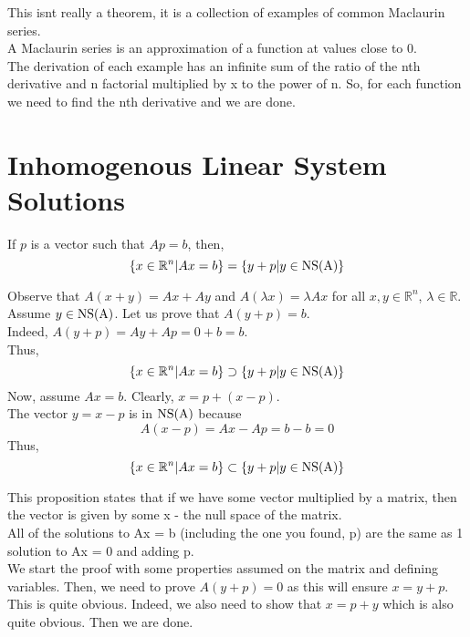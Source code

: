 \documentclass[12pt]{article}
\begin{document}
\begin{explanation}{}
    This isnt really a theorem, it is a collection of examples of common Maclaurin series.\\
A Maclaurin series is an approximation of a function at values close to 0.\\
The derivation of each example has an infinite sum of the ratio of the nth derivative and n factorial multiplied by x to the power of n. So, for each function we need to find the nth derivative and we are done.\\
\end{explanation}


\section{Inhomogenous Linear System Solutions}
\begin{proposition}{}
If \(p\) is a vector such that \(Ap = b\), then,
\[\{x\in \mathbb R^n | Ax = b\} = \{y + p | y\in \rm{NS}(A)\}\]
\end{proposition}
\begin{prf}{}
Observe that \(A(x+y) = Ax + Ay\) and \(A(\lambda x) = \lambda Ax\) for all \(x, y \in \mathbb R^n\), \(\lambda \in \mathbb R\).\\
Assume \(y \in \rm{NS}(A)\). Let us prove that \(A(y + p) = b\).\\
Indeed, \(A(y+p) = Ay + Ap = 0 + b = b\).\\
Thus,\[\{x\in \mathbb R^n | Ax = b\} \supset \{y + p | y\in \rm{NS}(A)\}\]
Now, assume \(Ax = b\). Clearly, \(x = p + (x - p)\). \\
The vector \(y = x - p\) is in \(\rm{NS}(A)\) because \[A(x - p) = Ax - Ap = b - b = 0\]
Thus, \[\{x\in \mathbb R^n | Ax = b\} \subset \{y + p | y\in \rm{NS}(A)\}\]
\end{prf}
\begin{explanation}{}
    This proposition states that if we have some vector multiplied by a matrix, then the vector is given by some x - the null space of the matrix.\\
All of the solutions to Ax = b (including the one you found, p) are the same as 1 solution to Ax = 0 and adding p.\\
We start the proof with some properties assumed on the matrix and defining variables. Then, we need to prove $A(y+p) = 0$ as this will ensure $x = y + p$. This is quite obvious. Indeed, we also need to show that $x = p + y$ which is also quite obvious. Then we are done.\\
\end{explanation}
\end{document}
